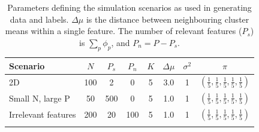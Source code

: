 \documentclass{bioinfo}
\begin{document}
\begin{table}[ht]
	\centering
	\caption{Parameters defining the simulation scenarios as used in generating data and labels. $\Delta \mu$ is the distance between neighbouring cluster means within a single feature.
	The number of relevant features (\(P_s\)) is $\sum_p \phi_p$, and $P_n = P - P_s$.}
	\begin{tabular}{l|ccccccc}
		\toprule
		\textbf{Scenario} & $N$ & $P_s$ & $P_n$ & $K$ & $\Delta \mu$ & $\sigma^2$ & $\pi$\\
		\midrule
		2D & 100 & 2 & 0 & 5 & 3.0 & 1 &  $(\frac{1}{5} , \frac{1}{5}, \frac{1}{5}, \frac{1}{5}, \frac{1}{5})$ \\
		Small N, large P & 50 & 500 & 0 & 5 & 1.0 & 1 &  $(\frac{1}{5} , \frac{1}{5}, \frac{1}{5}, \frac{1}{5}, \frac{1}{5})$\\
		Irrelevant features & 200 & 20 & 100 & 5 & 1.0 & 1 &  $(\frac{1}{5} , \frac{1}{5}, \frac{1}{5}, \frac{1}{5}, \frac{1}{5})$\\
		\botrule
	\end{tabular}
	\label{table:scenarioTable}
\end{table}%
\end{document}
